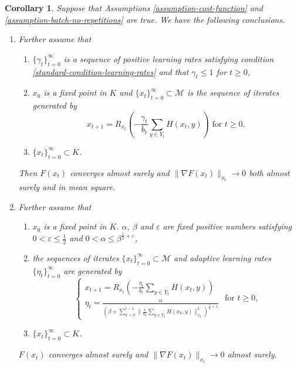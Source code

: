 \documentclass{amsart}
\newcommand{\ve}{\varepsilon}
\newcommand{\M}{\mathcal{M}}
\newcommand{\g}{\gamma}
\theoremstyle{plain}
\newtheorem{corollary}[theorem]{Corollary}
\theoremstyle{definition}
\theoremstyle{remark}
\numberwithin{theorem}{section}
\numberwithin{equation}{section}
\begin{document}
\begin{corollary}\label{cor-batch-no-repetitions}
Suppose that Assumptions \ref{assumption-cost-function} and \ref{assumption-batch-no-repetitions} are true. We have the following conclusions.
\begin{enumerate}[1.]
	\item Further assume that
\begin{enumerate}
	\item $\{\g_t\}_{t=0}^\infty$ is a sequence of positive learning rates satisfying condition \eqref{standard-condition-learning-rates} and that $\g_t\leq 1$ for $t\geq 0$,
	\item $x_0$ is a fixed point in $K$ and $\{x_t\}_{t=0}^\infty \subset \M$ is the sequence of iterates generated by
	\begin{equation}\label{eq-SGD-update-batch-no-repetitions-deterministic-learning-rate}
	x_{t+1} = R_{x_t}\left(-\frac{\g_t}{b_t}\sum_{y \in Y_t} H(x_t,y)\right) \text{ for } t \geq 0, 
	\end{equation}
	\item $\{x_t\}_{t=0}^\infty \subset K$.
\end{enumerate}
Then $F(x_t)$ converges almost surely and $\|\nabla F(x_t)\|_{x_t} \rightarrow 0$ both almost surely and in mean square.
  \item Further assume that
\begin{enumerate}
	\item $x_0$ is a fixed point in $K$. $\alpha,~\beta$ and $\ve$ are fixed positive numbers satisfying  $0 < \ve \leq \frac{1}{2}$ and $ 0<\alpha \leq \beta^{\frac{1}{2}+\ve}$,
	\item the sequences of iterates $\{x_t\}_{t=0}^\infty \subset \M$ and adaptive learning rates $\{\eta_t\}_{t=0}^\infty$ are  generated by
	\begin{equation}\label{eq-SGD-update-batch-no-repetitions-adaptive-learning-rate}
	\begin{cases}
	x_{t+1} = R_{x_t}\left(-\frac{\eta_t}{b_t}\sum_{y \in Y_t} H(x_t,y)\right) \\
	\eta_t = \frac{\alpha}{(\beta + \sum_{k=0}^{t-1}\|\frac{1}{b_k}\sum_{y\in Y_k} H(x_k,y)\|_{x_k}^2)^{\frac{1}{2}+\ve}}
	\end{cases}\text{ for } t \geq 0, 
	\end{equation}
	\item $\{x_t\}_{t=0}^\infty \subset K$.
\end{enumerate}
 $F(x_t)$ converges almost surely and $\|\nabla F(x_t)\|_{x_t} \rightarrow 0$ almost surely.
\end{enumerate}
\end{corollary}
\end{document}
